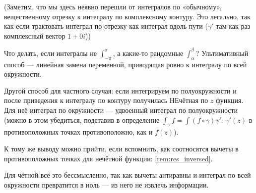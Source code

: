 \documentclass[12pt, a4paper]{article}
\begin{document}
(Заметим, что мы здесь неявно перешли от интегралов по «обычному», вещественному отрезку 
к интегралу по комплексному контуру. Это легально, так как если трактовать интеграл по отрезку как интеграл вдоль пути ($\gamma'$ там как раз комплексный вектор $1 + 0i$))

\begin{remark}
  Что делать, если интегралы не $\int_{-\pi}^{\pi}$, а какие-то рандомные $\int_{\alpha}^{\beta}$?
  Ультимативный способ — линейная замена переменной, приводящая ровно к интегралу по всей окружности.
\end{remark}

\begin{remark}
  Другой способ для частного случая: если интегрируем по полуокружности и после приведения к интегралу по контуру получилась НЕчётная по $z$ функция.
  Для неё интеграл по окружности — удвоенный интеграл по полуокружности (можно в этом убедиться, подставив в определение $\int_\gamma f = \int (f \circ \gamma) \gamma'$: 
  $\gamma'(z)$ в противоположных точках противоположно, как и $f(z)$).

  К тому же выводу можно прийти, если вспомнить, как соотносятся вычеты в противоположных точках для нечётной функции: \ref{rem:res_inversed}.

  Для чётной всё это бессмысленно, так как вычеты антиравны и интеграл по всей окружности превратится в ноль — из него не извлечь информации.
\end{remark}
\end{document}
